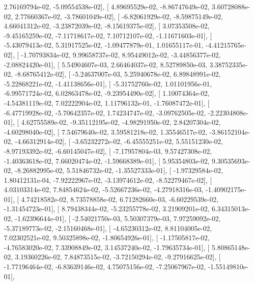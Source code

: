 \documentclass{article}
\begin{document}
          2.76169794e-02,  -5.09554538e-02],
       [  4.89695529e-02,  -8.86747649e-02,   3.60728088e-02,
          2.77660367e-02,  -3.78601049e-02],
       [ -6.82061929e-02,  -8.59875149e-02,   4.66041312e-02,
         -3.23872039e-02,  -8.15619375e-02],
       [  3.07353508e-02,  -9.45165259e-02,  -7.11718617e-02,
          7.10712107e-02,  -1.11671603e-01],
       [ -5.43079413e-02,   5.31917525e-02,  -1.09477879e-01,
          1.01655117e-01,  -4.41215765e-02],
       [ -1.70793834e-02,   9.99658737e-02,   8.95449012e-02,
         -3.44856377e-02,  -2.08824420e-01],
       [  5.54904607e-03,   2.66464037e-02,   8.52789850e-03,
          3.38752335e-02,  -8.68765412e-02],
       [ -5.24637007e-03,   5.25940678e-02,   6.89848991e-02,
         -5.22868221e-02,  -1.41138656e-01],
       [ -5.31752760e-02,   1.01101956e-01,  -6.99571724e-02,
          6.02863478e-02,  -9.23954490e-02],
       [  1.10074364e-02,  -4.54381119e-02,   7.02222904e-02,
          1.11796132e-01,  -1.76087472e-01],
       [ -6.47719928e-02,  -5.70642357e-02,   1.74234747e-02,
         -3.09762505e-02,  -2.22304808e-01],
       [  4.62755589e-02,  -9.35112195e-02,  -4.98291950e-02,
          2.84207304e-02,  -4.60298040e-02],
       [  7.54679640e-02,   3.59581218e-02,   1.35546517e-02,
         -3.86152104e-02,  -4.66312914e-02],
       [ -3.65232272e-02,  -6.45555251e-02,   5.55151230e-02,
         -8.97193392e-02,  -6.60145047e-02],
       [ -7.17957804e-03,   9.57427308e-02,  -1.40363618e-02,
          7.66020474e-02,  -1.59668389e-01],
       [  5.95354803e-02,   9.30535693e-02,  -8.26882995e-02,
          5.51846732e-02,  -1.35527333e-01],
       [ -1.97329584e-02,   1.80412131e-04,  -7.92222967e-02,
         -3.13974612e-02,  -8.52279467e-02],
       [  4.03103314e-02,   7.84854624e-02,  -5.52667236e-02,
         -4.27918316e-03,  -1.40902175e-01],
       [  4.74218582e-02,   8.73578858e-02,   6.71282660e-03,
         -6.60229539e-02,  -1.31454723e-01],
       [  8.79438344e-02,  -5.23255778e-02,   3.21909201e-02,
          6.34315013e-02,  -1.62396644e-01],
       [ -2.54021750e-03,   5.50307379e-03,   7.97259092e-02,
         -5.37189773e-02,  -2.15160468e-01],
       [ -4.65230312e-02,   8.81104005e-02,   7.02302521e-02,
          9.50325898e-02,  -1.80654926e-01],
       [ -1.17505817e-02,  -4.76583020e-02,   7.33908849e-02,
          3.14537240e-02,  -1.79635734e-01],
       [  5.80865148e-02,   3.19360226e-02,   7.84873515e-02,
         -3.72150294e-02,  -9.27916625e-02],
       [ -1.77196464e-02,  -6.83639146e-02,   4.75075156e-02,
         -7.25067967e-02,  -1.55149810e-01],
\end{document}
